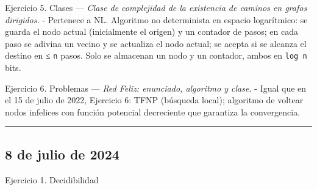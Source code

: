 \documentclass[12pt]{book} %
\begin{document}
Ejercicio 5. Clases --- \emph{Clase de complejidad de la existencia de
caminos en grafos dirigidos.} - Pertenece a NL. Algoritmo no
determinista en espacio logarítmico: se guarda el nodo actual
(inicialmente el origen) y un contador de pasos; en cada paso se adivina
un vecino y se actualiza el nodo actual; se acepta si se alcanza el
destino en ≤ \texttt{n} pasos. Solo se almacenan un nodo y un contador,
ambos en \texttt{log\ n} bits.

Ejercicio 6. Problemas --- \emph{Red Feliz: enunciado, algoritmo y
clase.} - Igual que en el 15 de julio de 2022, Ejercicio 6: TFNP
(búsqueda local); algoritmo de voltear nodos infelices con función
potencial decreciente que garantiza la convergencia.

\begin{center}\rule{0.5\linewidth}{0.5pt}\end{center}

\hypertarget{de-julio-de-2024}{%
\subsection{8 de julio de 2024}\label{de-julio-de-2024}}

Ejercicio 1. Decidibilidad
\end{document}
